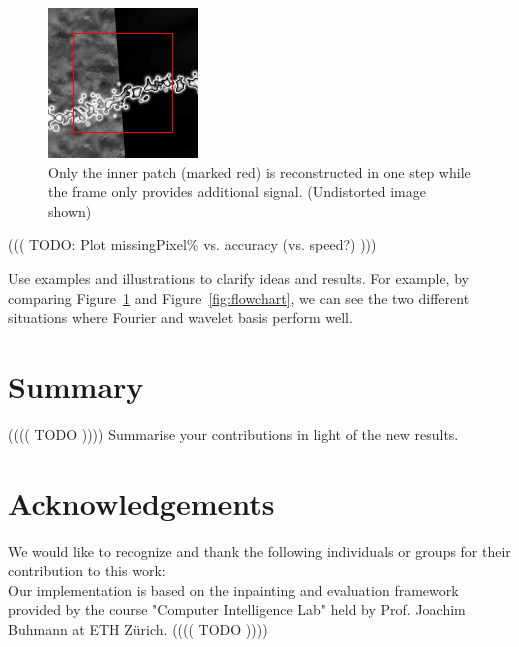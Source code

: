 \documentclass[10pt,conference,compsocconf]{IEEEtran}
\begin{document}
\begin{figure}[tbp]
  \centering
  \includegraphics[width=\columnwidth]{images/imageFraming}
  \caption{Only the inner patch (marked red) is reconstructed in one step while the frame only provides additional signal. (Undistorted image shown) }
  \label{fig:framing}
\end{figure}

((( TODO: Plot missingPixel\% vs. accuracy (vs. speed?) )))

Use examples and illustrations to clarify ideas and results. For
example, by comparing Figure~\ref{fig:framing} and
Figure~\ref{fig:flowchart}, we can see the two different
situations where Fourier and wavelet basis perform well. 

\section{Summary}
(((( TODO ))))
  Summarise your contributions in light of the new
  results.
  

\section*{Acknowledgements}
We would like to recognize and thank the following individuals or groups for their contribution to this work:\\
Our implementation is based on the inpainting and evaluation framework provided by the course "Computer Intelligence Lab" held by Prof. Joachim Buhmann at ETH Zürich.
(((( TODO ))))
\end{document}
